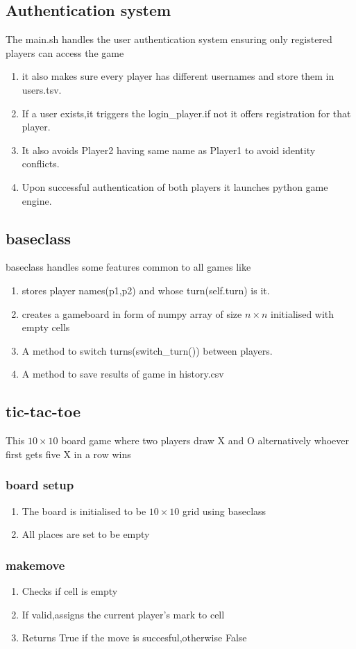 \documentclass{article}
\begin{document}
\subsection{Authentication system}
The main.sh handles the user authentication system ensuring only registered players can access the game
\begin{enumerate}
    \item it also makes sure every player has different usernames and store them in users.tsv.
    \item If a user exists,it triggers the login\_player.if not it offers registration for that player.
    \item It also avoids Player2 having same name as Player1 to avoid identity conflicts. 
    \item Upon successful authentication of both players it launches python game engine.
\end{enumerate}
\subsection{baseclass}
baseclass handles some features common to all games like
\begin{enumerate}
    \item stores player names(p1,p2) and whose turn(self.turn) is it.
    \item creates a gameboard in form of numpy array of size $n \times n$ initialised with empty cells
    \item A method to switch turns(switch\_turn()) between players.
    \item A method to save results of game in history.csv
\end{enumerate}
\subsection{tic-tac-toe}
This $10 \times 10$ board game where two players draw X and O alternatively whoever first gets five X in a row wins
\subsubsection{board setup}
\begin{enumerate}
    \item The board is initialised to be $10 \times 10$ grid using baseclass
    \item All places are set to be empty
\end{enumerate}
\subsubsection{makemove}
\begin{enumerate}
    \item Checks if cell is empty
    \item If valid,assigns the current player's mark to cell
    \item Returns True if the move is succesful,otherwise False
\end{enumerate}
\end{document}
